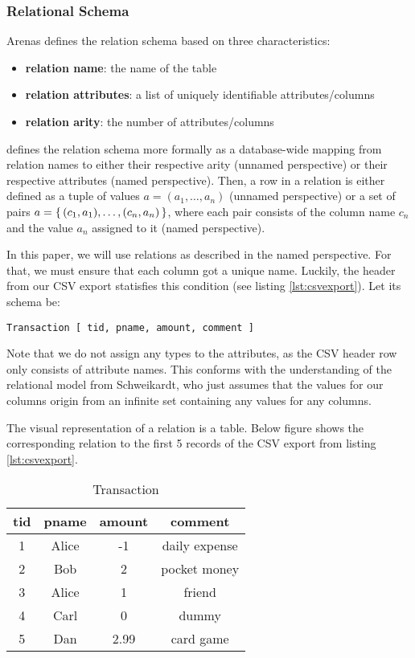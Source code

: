 \subsubsection{Relational Schema}
Arenas defines the relation schema based on three characteristics:
\begin{itemize}
    \item \textbf{relation name}: the name of the table
    \item \textbf{relation attributes}: a list of uniquely identifiable attributes/columns
    \item \textbf{relation arity}: the number of attributes/columns
\end{itemize}
\cite{Schw10} defines the relation schema more formally as a database-wide mapping
from relation names to either their respective arity (unnamed perspective) or
their respective attributes (named perspective). Then, a row in a relation
is either defined as a tuple of values $a = (a_1,\dots, a_n)$ (unnamed perspective) or
a set of pairs $a = \set{(c_1, a_1),\dots, (c_n, a_n)}$, where each pair consists of
the column name $c_n$ and the value $a_n$ assigned to it (named perspective).

In this paper, we will use relations as described in the named perspective.
For that, we must ensure that each column
got a unique name. Luckily, the header from our \gls{CSV} export statisfies this condition
(see listing \ref{lst:csvexport}). Let its schema be:

\begin{center} \label{schema}
\verb+Transaction [ tid, pname, amount, comment ]+
\end{center}

Note that we do not assign any types to the attributes,
as the \gls{CSV} header row only consists of attribute names.
This conforms with the understanding of the relational model
from Schweikardt, who just assumes that the values for our columns origin from an infinite set
containing any values for any columns.

The visual representation of a relation is a table. Below figure shows the
corresponding relation to the first 5 records of the \gls{CSV} export from listing \ref{lst:csvexport}.

\begin{table}[htbp]
    \centering
    \begin{tabular}{|c|c|c|c|}
        \hline
        tid     & pname & amount    & comment \\ \hline\hline
        1       & Alice & -1        & daily expense \\ \hline
        2       & Bob   & 2         & pocket money \\ \hline
        3       & Alice & 1         & friend\\ \hline
        4       & Carl  & 0         & dummy\\ \hline
        5       & Dan   & 2.99      & card game\\ \hline
    \end{tabular}
    \caption{Transaction}
    \label{Transaction}
\end{table}

